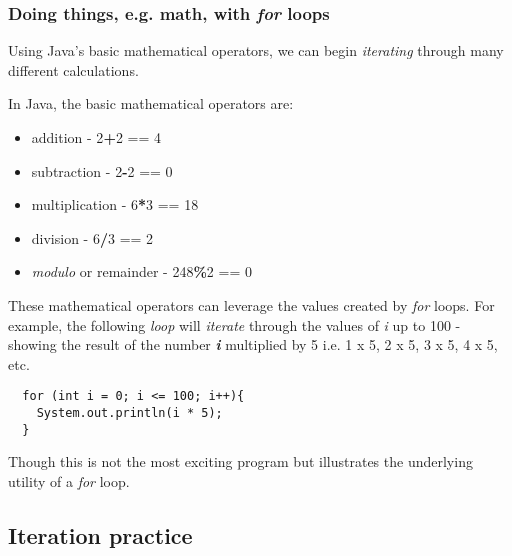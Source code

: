 \documentclass{article}
\begin{document}
\begin{flushleft}
\subsubsection{Doing things, e.g. math, with \emph{for} loops}
Using Java's basic mathematical operators, we can begin \emph{iterating} through many different calculations.
\begin{tcolorbox}[enhanced,width=5in,center upper,
    fontupper=\bfseries,drop fuzzy shadow southwest,
    boxrule=0.4pt,sharp corners,colframe=yellow!80!black,colback=yellow!10]
In Java, the basic mathematical operators are:  
\begin{itemize}
\item addition - 2\textbf{+}2 == 4
\item subtraction - 2\textbf{-}2 == 0
\item multiplication - 6\textbf{*}3 == 18
\item division - 6\textbf{/}3 == 2
\item \emph{modulo} or remainder - 248\textbf{\%}2 == 0
\end{itemize}
\end{tcolorbox}
\par

These mathematical operators can leverage the values created by \emph{for} loops.
For example, the following \emph{loop} will \emph{iterate} through the values of \emph{i} up to 100 - showing the result of the number \emph{\textbf{i}} multiplied by 5 i.e. 1 x 5, 2 x 5, 3 x 5, 4 x 5, etc.
\begin{verbatim}
  for (int i = 0; i <= 100; i++){
    System.out.println(i * 5);
  }
\end{verbatim}
\par
Though this is not the most exciting program but illustrates the underlying utility of a \emph{for} loop.







\newpage

\subsection{Iteration practice}



\end{flushleft}
\end{document}
